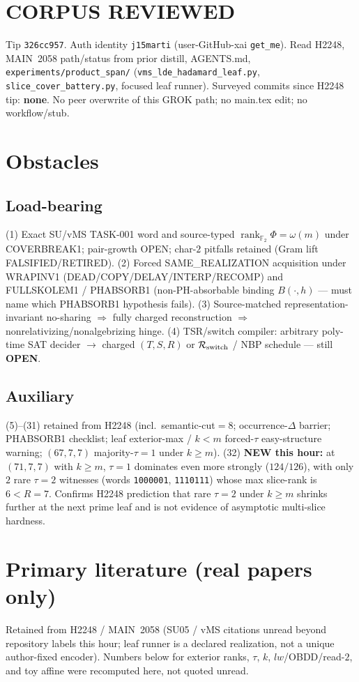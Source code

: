 \documentclass[11pt]{article}
\begin{document}
\section*{CORPUS REVIEWED}
Tip \texttt{326cc957}. Auth identity \texttt{j15marti} (user-GitHub-xai \texttt{get\_me}).
Read H2248, MAIN~2058 path/status from prior distill, AGENTS.md,
\texttt{experiments/product\_span/} (\texttt{vms\_lde\_hadamard\_leaf.py},
\texttt{slice\_cover\_battery.py}, focused leaf runner).
Surveyed commits since H2248 tip: \textbf{none}.
No peer overwrite of this GROK path; no main.tex edit; no workflow/stub.

\section*{Obstacles}
\subsection*{Load-bearing}
(1) Exact SU/vMS TASK-001 word and source-typed
$\operatorname{rank}_{\mathbb F_2}\Phi=\omega(m)$ under COVERBREAK1; pair-growth OPEN;
char-$2$ pitfalls retained (Gram lift FALSIFIED/RETIRED).
(2) Forced SAME\_REALIZATION acquisition under WRAPINV1
(DEAD/COPY/DELAY/INTERP/RECOMP) and FULLSKOLEM1 / PHABSORB1
(non-PH-absorbable binding $B(\cdot,h)$ --- must name which PHABSORB1 hypothesis fails).
(3) Source-matched representation-invariant no-sharing $\Rightarrow$ fully charged reconstruction
$\Rightarrow$ nonrelativizing/nonalgebrizing hinge.
(4) TSR/switch compiler: arbitrary poly-time SAT decider $\to$ charged $(T,S,R)$ or
$\mathcal R_{\rm switch}$ / NBP schedule --- still \textbf{OPEN}.

\subsection*{Auxiliary}
(5)--(31) retained from H2248 (incl.\ semantic-cut$=8$; occurrence-$\Delta$ barrier;
PHABSORB1 checklist; leaf exterior-max / $k{<}m$ forced-$\tau$ easy-structure warning;
$(67,7,7)$ majority-$\tau{=}1$ under $k{\ge}m$).
(32) \textbf{NEW this hour:} at $(71,7,7)$ with $k{\ge}m$, $\tau{=}1$ dominates even more
strongly ($124/126$), with only $2$ rare $\tau{=}2$ witnesses (words \texttt{1000001},
\texttt{1110111}) whose max slice-rank is $6{<}R{=}7$.
Confirms H2248 prediction that rare $\tau{=}2$ under $k{\ge}m$ shrinks further at the next
prime leaf and is not evidence of asymptotic multi-slice hardness.

\section*{Primary literature (real papers only)}
Retained from H2248 / MAIN~2058 (SU05 / vMS citations unread beyond repository labels this hour;
leaf runner is a declared realization, not a unique author-fixed encoder).
Numbers below for exterior ranks, $\tau$, $k$, $lw$/OBDD/read-$2$, and toy affine
were recomputed here, not quoted unread.
\end{document}
